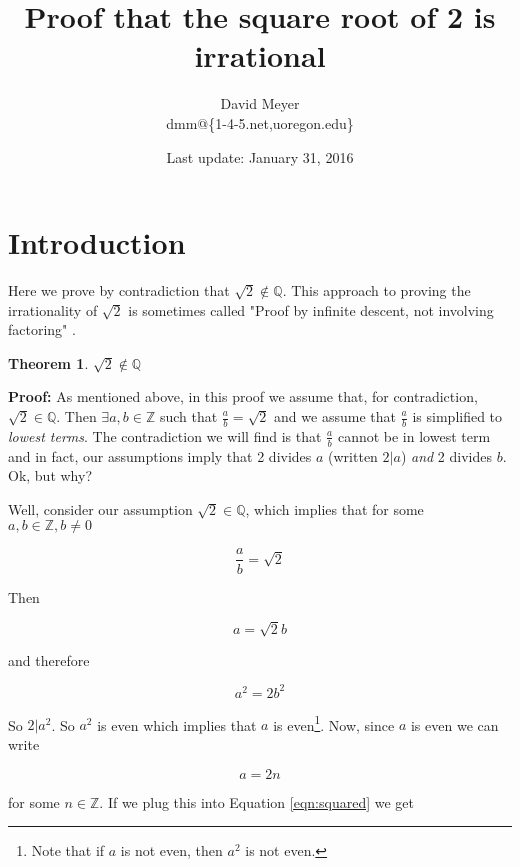\documentclass[11pt, oneside]{article}   	%
\title{Proof that the square root of 2 is irrational}
\author{David Meyer \\ dmm@\{1-4-5.net,uoregon.edu\}}
\date{Last update: January 31, 2016}							%
\theoremstyle{definition}
\newtheorem{thm}{Theorem}[section]
\begin{document}
\maketitle

\section{Introduction}
Here we prove by contradiction that $\sqrt{2} \notin \mathbb{Q}$. This approach to proving the irrationality of $\sqrt{2}$ is sometimes called
"Proof by infinite descent, not involving factoring" \cite{wiki:sqrt2}.

\begin{thm}
$\sqrt{2} \notin \mathbb{Q}$
\end{thm}

\noindent
\textbf{Proof:} As mentioned above, in this proof we assume that, for contradiction,  $\sqrt{2} \in \mathbb{Q}$. Then $\exists a,b  \in \mathbb{Z}$
such that $\frac{a}{b} = \sqrt{2}$ and  we assume that $\frac{a}{b}$ is simplified to \emph{lowest terms}. The contradiction we will find is that 
$\frac{a}{b}$ cannot be in lowest term and in fact, our assumptions imply that 2 divides $a$ (written $2|a$) \emph{and}  2 divides $b$. Ok, but why?


\bigskip
\noindent
Well, consider our assumption $\sqrt{2} \in \mathbb{Q}$, which implies that for some $a,b \in \mathbb{Z}, b \neq 0$

\bigskip
\begin{equation*}
\frac{a}{b} = \sqrt{2}
\end{equation*}


\bigskip
\noindent
Then 

\begin{equation*}
a = \sqrt{2} b
\end{equation*}

\bigskip
\noindent
and therefore 

\begin{equation}
a^2 = 2b^2
\label{eqn:squared}
\end{equation}

\bigskip
\noindent
So $2|a^2$. So $a^2$ is even which implies that $a$ is even\footnote{Note that if $a$ is not even, then $a^2$ is not even.}. Now, since $a$ is even we can
write 

\begin{equation}
a = 2n
\label{eqn:a}
\end{equation}

\bigskip
\noindent
for some $n \in \mathbb{Z}$. If we plug this into Equation \ref{eqn:squared} we get
\end{document}
